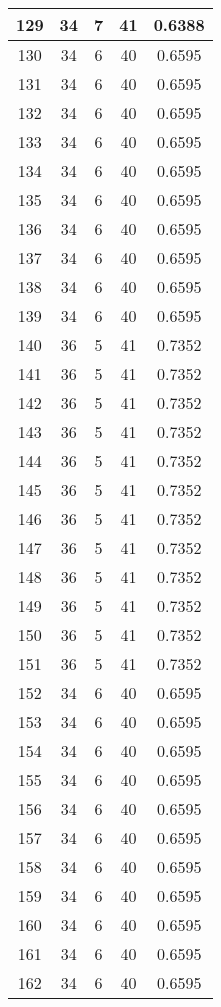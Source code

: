 \documentclass[letterpaper, 12pt]{article}
\begin{document}
\begin{longtable}{|c|c|c|c|c|}
\hline
129 & 34 & 7 & 41 & 0.6388 \\
\hline
130 & 34 & 6 & 40 & 0.6595 \\
\hline
131 & 34 & 6 & 40 & 0.6595 \\
\hline
132 & 34 & 6 & 40 & 0.6595 \\
\hline
133 & 34 & 6 & 40 & 0.6595 \\
\hline
134 & 34 & 6 & 40 & 0.6595 \\
\hline
135 & 34 & 6 & 40 & 0.6595 \\
\hline
136 & 34 & 6 & 40 & 0.6595 \\
\hline
137 & 34 & 6 & 40 & 0.6595 \\
\hline
138 & 34 & 6 & 40 & 0.6595 \\
\hline
139 & 34 & 6 & 40 & 0.6595 \\
\hline
140 & 36 & 5 & 41 & 0.7352 \\
\hline
141 & 36 & 5 & 41 & 0.7352 \\
\hline
142 & 36 & 5 & 41 & 0.7352 \\
\hline
143 & 36 & 5 & 41 & 0.7352 \\
\hline
144 & 36 & 5 & 41 & 0.7352 \\
\hline
145 & 36 & 5 & 41 & 0.7352 \\
\hline
146 & 36 & 5 & 41 & 0.7352 \\
\hline
147 & 36 & 5 & 41 & 0.7352 \\
\hline
148 & 36 & 5 & 41 & 0.7352 \\
\hline
149 & 36 & 5 & 41 & 0.7352 \\
\hline
150 & 36 & 5 & 41 & 0.7352 \\
\hline
151 & 36 & 5 & 41 & 0.7352 \\
\hline
152 & 34 & 6 & 40 & 0.6595 \\
\hline
153 & 34 & 6 & 40 & 0.6595 \\
\hline
154 & 34 & 6 & 40 & 0.6595 \\
\hline
155 & 34 & 6 & 40 & 0.6595 \\
\hline
156 & 34 & 6 & 40 & 0.6595 \\
\hline
157 & 34 & 6 & 40 & 0.6595 \\
\hline
158 & 34 & 6 & 40 & 0.6595 \\
\hline
159 & 34 & 6 & 40 & 0.6595 \\
\hline
160 & 34 & 6 & 40 & 0.6595 \\
\hline
161 & 34 & 6 & 40 & 0.6595 \\
\hline
162 & 34 & 6 & 40 & 0.6595 \\

\end{longtable}
\end{document}
